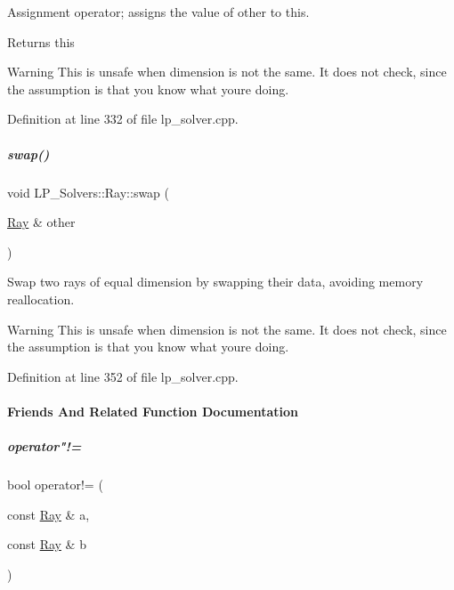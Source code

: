 Assignment operator; assigns the value of {\ttfamily other} to {\ttfamily this}. 

\begin{DoxyReturn}{Returns}
{\ttfamily this} 
\end{DoxyReturn}
\begin{DoxyWarning}{Warning}
This is unsafe when dimension is not the same. It does not check, since the assumption is that you know what you\textquotesingle{}re doing. 
\end{DoxyWarning}


Definition at line 332 of file lp\+\_\+solver.\+cpp.

\mbox{\label{group___c_l_s_solvers_acea89ef5df0792e64ce9003ad19913d4}} 
\subparagraph{\texorpdfstring{swap()}{swap()}}
{\footnotesize\ttfamily void L\+P\+\_\+\+Solvers\+::\+Ray\+::swap (\begin{DoxyParamCaption}\item[{\hyperlink{group___c_l_s_solvers_class_l_p___solvers_1_1_ray}{Ray} \&}]{other }\end{DoxyParamCaption})}



Swap two rays of equal dimension by swapping their data, avoiding memory reallocation. 

\begin{DoxyWarning}{Warning}
This is unsafe when dimension is not the same. It does not check, since the assumption is that you know what you\textquotesingle{}re doing. 
\end{DoxyWarning}


Definition at line 352 of file lp\+\_\+solver.\+cpp.



\paragraph{Friends And Related Function Documentation}
\mbox{\label{group___c_l_s_solvers_a79435f27d182af0ad5dda3646d24ecd8}} 
\subparagraph{\texorpdfstring{operator"!=}{operator!=}}
{\footnotesize\ttfamily bool operator!= (\begin{DoxyParamCaption}\item[{const \hyperlink{group___c_l_s_solvers_class_l_p___solvers_1_1_ray}{Ray} \&}]{a,  }\item[{const \hyperlink{group___c_l_s_solvers_class_l_p___solvers_1_1_ray}{Ray} \&}]{b }\end{DoxyParamCaption})\hspace{0.3cm}{\ttfamily [friend]}}



